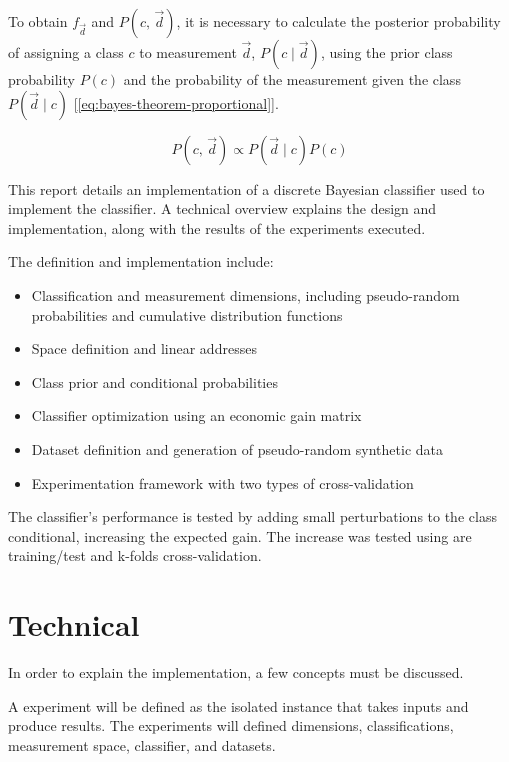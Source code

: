 \documentclass[letterpaper, conference]{IEEEtran}
\begin{document}
To obtain $f_{\vec{d}}$ and $P(c,\, \vec{d})$, it is necessary to calculate the posterior probability of assigning a class $c$ to measurement $\vec{d}$, $P(c \mid \vec{d})$, using the prior class probability $P(c)$ and the probability of the measurement given the class $P(\vec{d} \mid c)$ [\ref{eq:bayes-theorem-proportional}].

\begin{equation} \label{eq:bayes-theorem-proportional}
  P(c,\, \vec{d}) \mathbin{\propto} P(\vec{d} \mid c) \mathbin{} P(c)
\end{equation}

This report details an implementation of a discrete Bayesian classifier used to implement the classifier. A technical overview explains the design and implementation, along with the results of the experiments executed.

The definition and implementation include:

\begin{itemize}
  \item Classification and measurement dimensions, including pseudo-random probabilities and cumulative distribution functions
  \item Space definition and linear addresses
  \item Class prior and conditional probabilities
  \item Classifier optimization using an economic gain matrix
  \item Dataset definition and generation of pseudo-random synthetic data
  \item Experimentation framework with two types of cross-validation
\end{itemize}

The classifier's performance is tested by adding small perturbations to the class conditional, increasing the expected gain. The increase was tested using are training/test and k-folds cross-validation.

\section{Technical}

In order to explain the implementation, a few concepts must be discussed.

A experiment will be defined as the isolated instance that takes inputs and produce results. The experiments will defined dimensions, classifications, measurement space, classifier, and datasets.
\end{document}
